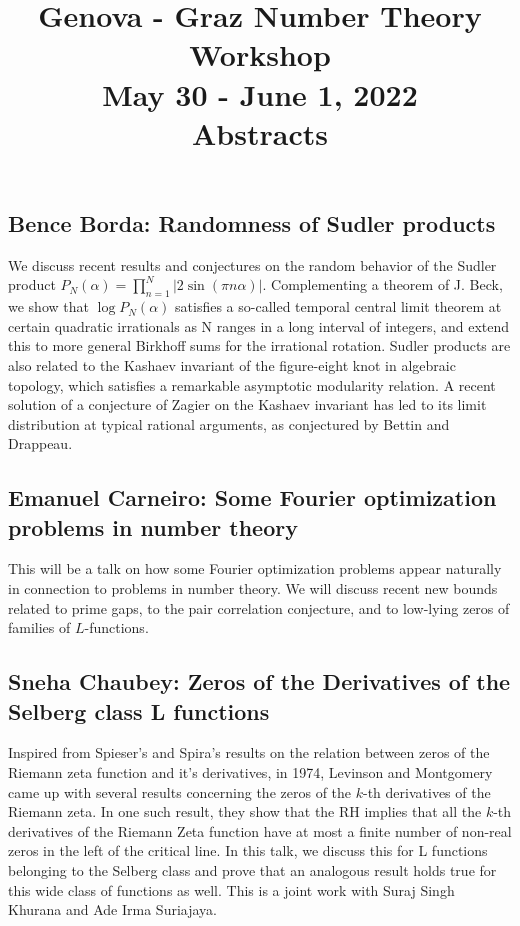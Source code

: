 \documentclass[15pt]{article}
\title{Genova - Graz Number Theory Workshop\\ {\large May 30 - June 1, 2022}\\[1em] Abstracts}
\author{}
\date{}
\begin{document}
\maketitle
\thispagestyle{empty}

\vspace{-5em}

\subsection*{Bence Borda: Randomness of Sudler products}

We discuss recent results and conjectures on the random behavior of the Sudler product $P_N(\alpha)=\prod_{n=1}^N |2 \sin (\pi n \alpha)|$. Complementing a theorem of J. Beck, we show that $\log P_N(\alpha)$ satisfies a so-called temporal central limit theorem at certain quadratic irrationals as N ranges in a long interval of integers, and extend this to more general Birkhoff sums for the irrational rotation. Sudler products are also related to the Kashaev invariant of the figure-eight knot in algebraic topology, which satisfies a remarkable asymptotic modularity relation. A recent solution of a conjecture of Zagier on the Kashaev invariant has led to its limit distribution at typical rational arguments, as conjectured by Bettin and Drappeau.



\subsection*{Emanuel Carneiro: Some Fourier optimization problems in number theory}

This will be a talk on how some Fourier optimization problems appear naturally in connection to problems in number theory. We will discuss recent new bounds related to prime gaps, to the pair correlation conjecture, and to low-lying zeros of families of $L$-functions.

\subsection*{Sneha Chaubey: Zeros of the Derivatives of the Selberg class L functions}

Inspired from Spieser's and Spira's results on the relation between zeros of the Riemann zeta function and it's derivatives, in 1974, Levinson and Montgomery came up with several results concerning the zeros of the $k$-th derivatives of the Riemann zeta.  In one such result, they show that the RH implies that all the $k$-th derivatives of the Riemann Zeta function have at most a finite number of non-real zeros in the left of the critical line. In this talk, we discuss this for L functions belonging to the Selberg class and prove that an analogous result holds true for this wide class of functions as well. This is a joint work with Suraj Singh Khurana and Ade Irma Suriajaya.
\end{document}
